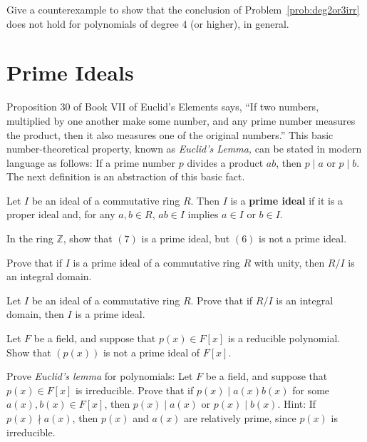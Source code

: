 \begin{problem}
Give a counterexample to show that the conclusion of Problem~\ref{prob:deg2or3irr} does not hold for polynomials of degree 4 (or higher), in general.
\end{problem}

\section{Prime Ideals}
Proposition 30 of Book VII of Euclid's Elements says, ``If two numbers, multiplied by one another make some number, and any prime number measures the product, then it also measures one of the original numbers.'' This basic number-theoretical property, known as \emph{Euclid's Lemma,} can be stated in modern language as follows: If a prime number \(p\) divides a product \(ab\), then \(p\mid a\) or \(p \mid b\). The next definition is an abstraction of this basic fact.

\begin{definition}
Let \(I\) be an ideal of a commutative ring \(R\). Then \(I\) is a \textbf{prime ideal} if it is a proper ideal and, for any \(a,b\in R\), \(ab \in I\) implies \(a \in I\) or \(b \in I\).
\end{definition}

\begin{problem}
In the ring \(\mathbb{Z}\), show that \((7)\) is a prime ideal, but \((6)\) is not a prime ideal.
\end{problem}

\begin{problem}
Prove that if \(I\) is a prime ideal of a commutative ring \(R\) with unity, then \(R/I\) is an integral domain.
\end{problem}

\begin{problem}
Let \(I\) be an ideal of a commutative ring \(R\). Prove that if \(R/I\) is an integral domain, then \(I\) is a prime ideal.
\end{problem}

\begin{problem}
Let \(F\) be a field, and suppose that \(p(x) \in F[x]\) is a reducible polynomial. Show that \((p(x))\) is not a prime ideal of \(F[x]\).
\end{problem}

\begin{problem}
Prove \emph{Euclid's lemma} for polynomials: Let \(F\) be a field, and suppose that \(p(x)\in F[x]\) is irreducible. Prove that if \(p(x) \mid a(x)b(x)\) for some \(a(x),b(x)\in F[x]\), then \(p(x) \mid a(x)\) or \(p(x) \mid b(x)\). Hint: If \(p(x) \nmid a(x)\), then \(p(x)\) and \(a(x)\) are relatively prime, since \(p(x)\) is irreducible.
\end{problem}

